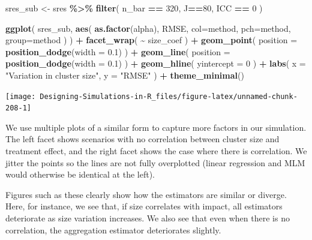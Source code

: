 \documentclass[
]{book}
\newenvironment{Shaded}{\begin{snugshade}}{\end{snugshade}}
\newcommand{\AttributeTok}[1]{\textcolor[rgb]{0.13,0.29,0.53}{#1}}
\newcommand{\DecValTok}[1]{\textcolor[rgb]{0.00,0.00,0.81}{#1}}
\newcommand{\FloatTok}[1]{\textcolor[rgb]{0.00,0.00,0.81}{#1}}
\newcommand{\FunctionTok}[1]{\textcolor[rgb]{0.13,0.29,0.53}{\textbf{#1}}}
\newcommand{\NormalTok}[1]{#1}
\newcommand{\OtherTok}[1]{\textcolor[rgb]{0.56,0.35,0.01}{#1}}
\newcommand{\SpecialCharTok}[1]{\textcolor[rgb]{0.81,0.36,0.00}{\textbf{#1}}}
\newcommand{\StringTok}[1]{\textcolor[rgb]{0.31,0.60,0.02}{#1}}
\begin{document}
\begin{Shaded}
\begin{Highlighting}[]
\NormalTok{sres\_sub }\OtherTok{\textless{}{-}}\NormalTok{ sres }\SpecialCharTok{\%\textgreater{}\%}
  \FunctionTok{filter}\NormalTok{( n\_bar }\SpecialCharTok{==} \DecValTok{320}\NormalTok{, J}\SpecialCharTok{==}\DecValTok{80}\NormalTok{, ICC }\SpecialCharTok{==} \DecValTok{0}\NormalTok{ )}

\FunctionTok{ggplot}\NormalTok{( sres\_sub, }\FunctionTok{aes}\NormalTok{( }\FunctionTok{as.factor}\NormalTok{(alpha), RMSE, }
                       \AttributeTok{col=}\NormalTok{method, }\AttributeTok{pch=}\NormalTok{method, }\AttributeTok{group=}\NormalTok{method ) ) }\SpecialCharTok{+}
  \FunctionTok{facet\_wrap}\NormalTok{( }\SpecialCharTok{\textasciitilde{}}\NormalTok{ size\_coef ) }\SpecialCharTok{+}
  \FunctionTok{geom\_point}\NormalTok{( }\AttributeTok{position =} \FunctionTok{position\_dodge}\NormalTok{(}\AttributeTok{width =} \FloatTok{0.1}\NormalTok{) ) }\SpecialCharTok{+} 
  \FunctionTok{geom\_line}\NormalTok{( }\AttributeTok{position =} \FunctionTok{position\_dodge}\NormalTok{(}\AttributeTok{width =} \FloatTok{0.1}\NormalTok{) ) }\SpecialCharTok{+}
  \FunctionTok{geom\_hline}\NormalTok{( }\AttributeTok{yintercept =} \DecValTok{0}\NormalTok{ ) }\SpecialCharTok{+}
  \FunctionTok{labs}\NormalTok{( }\AttributeTok{x =} \StringTok{"Variation in cluster size"}\NormalTok{, }\AttributeTok{y =} \StringTok{"RMSE"}\NormalTok{ ) }\SpecialCharTok{+}
  \FunctionTok{theme\_minimal}\NormalTok{() }
\end{Highlighting}
\end{Shaded}

\begin{center}\texttt{[image: Designing-Simulations-in-R\_files/figure-latex/unnamed-chunk-208-1]} \end{center}

We use multiple plots of a similar form to capture more factors in our simulation.
The left facet shows scenarios with no correlation between cluster size and treatment effect, and the right facet shows the case where there is correlation.
We jitter the points so the lines are not fully overplotted (linear regression and MLM would otherwise be identical at the left).

Figures such as these clearly show how the estimators are similar or diverge.
Here, for instance, we see that, if size correlates with impact, all estimators deteriorate as size variation increases.
We also see that even when there is no correlation, the aggregation estimator deteriorates slightly.
\end{document}
